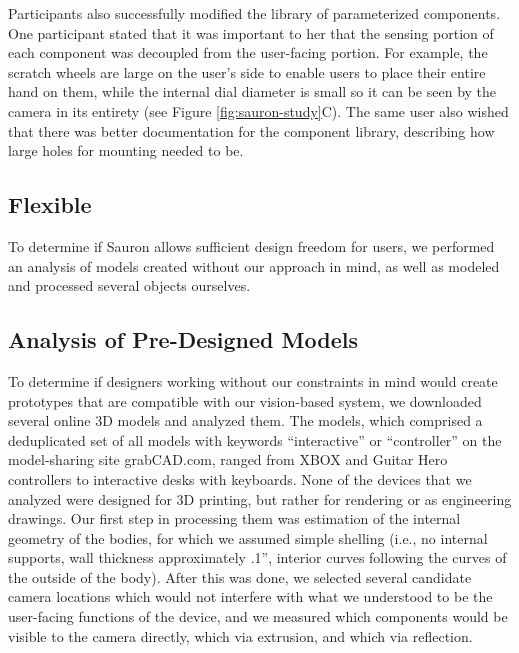     Participants also successfully modified the library of parameterized components. One participant stated that it was important to her that the sensing portion of each component was decoupled from the user-facing portion. For example, the scratch wheels are large on the user's side to enable users to place their entire hand on them, while the internal dial diameter is small so it can be seen by the camera in its entirety (see Figure \ref{fig:sauron-study}C). The same user also wished that there was better documentation for the component library, describing how large holes for mounting needed to be.


    \subsection{Flexible}
    
    To determine if Sauron allows sufficient design freedom for users, we performed an analysis of models created without our approach in mind, as well as modeled and processed several objects ourselves.
    
    \subsection{Analysis of Pre-Designed Models}
    To determine if designers working without our constraints in mind would create prototypes that are compatible with our vision-based system, we downloaded several online 3D models and analyzed them. The models, which comprised a deduplicated set of all models with keywords ``interactive'' or ``controller'' on the model-sharing site grabCAD.com, ranged from XBOX and Guitar Hero controllers to interactive desks with keyboards. None of the devices that we analyzed were designed for 3D printing, but rather for rendering or as engineering drawings. Our first step in processing them was estimation of the internal geometry of the bodies, for which we assumed simple shelling (i.e., no internal supports, wall thickness approximately .1'', interior curves following the curves of the outside of the body). After this was done, we selected several candidate camera locations which would not interfere with what we understood to be the user-facing functions of the device, and we measured which components would be visible to the camera directly, which via extrusion, and which via reflection. 

